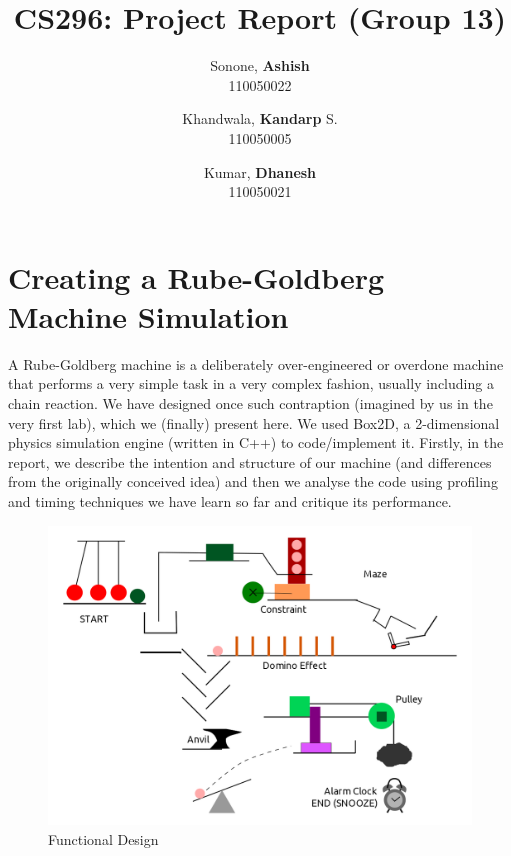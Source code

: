 \documentclass [a4paper, 11pt] {article}
\begin{document}
\title {CS296: Project Report (Group 13)}
\author {
	Sonone, \textbf {Ashish}\\
	110050022
	\and
	Khandwala, \textbf {Kandarp} S.\\
	110050005
	\and
	Kumar, \textbf {Dhanesh}\\
	110050021
}
\date {}
\maketitle

\section {Creating a Rube-Goldberg Machine Simulation}

A Rube-Goldberg machine is a deliberately over-engineered or overdone machine that performs a very simple task in a very complex fashion, usually including a chain reaction.
We have designed once such contraption (imagined by us in the very first lab), which we (finally) present here. We used Box2D, a 2-dimensional physics simulation engine
(written in C++) to code/implement it. Firstly, in the report, we describe the intention and structure of our machine (and differences from the originally conceived idea) and
then we analyse the code using profiling and timing techniques we have learn so far and critique its performance.

\begin{figure}[htpb]
	\includegraphics[width=\linewidth]{doc/images/new}
	\caption{Functional Design}
\end{figure}
\end{document}
